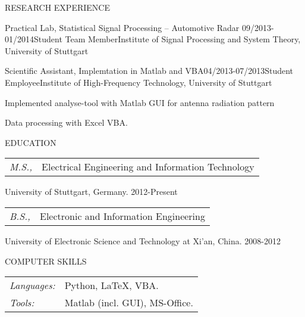 \documentclass{resume} %
\begin{document}
\begin{rSection}{RESEARCH  EXPERIENCE}
\begin{rSubsection}{Practical Lab, Statistical Signal Processing – Automotive Radar
}{09/2013-01/2014}{Student Team Member}{Institute of Signal Processing and System Theory, University of Stuttgart}
\end{rSubsection}

\begin{rSubsection}{Scientific Assistant, Implemtation in Matlab and VBA}{04/2013-07/2013}{Student Employee}{Institute of High-Frequency Technology, University of Stuttgart}

\item Implemented analyse-tool with Matlab GUI for antenna radiation pattern 
\item Data processing with Excel VBA.

\end{rSubsection}
\end{rSection}


\begin{rSection}{EDUCATION}
\begin{tabular}{l l}
 
{\sl M.S.,} & Electrical Engineering and Information Technology\\
\end{tabular}

University of Stuttgart, Germany. \hfill 2012-Present \\

\begin{tabular}{l l}
{\sl B.S.,} & Electronic and Information Engineering\\
\end{tabular}

University of Electronic Science and Technology at Xi'an, China. \hfill  2008-2012\\



\end{rSection}

\begin{rSection}{COMPUTER SKILLS}
\begin{tabular}{l l}
{\sl Languages:} &Python, \LaTeX{}, VBA. \\
{\sl Tools:} & Matlab (incl. GUI), MS-Office.
\end{tabular}

\end{rSection}
\end{document}
